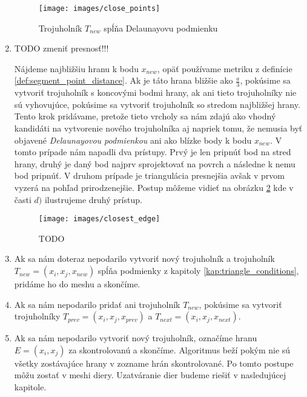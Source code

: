 \begin{enumerate}
{        \begin{figure}
            \centerline{\texttt{[image: images/close\_points]}}
            \caption[Trojuholník $T_{new}$ spĺňa Delaunayovu podmienku]{Trojuholník $T_{new}$ spĺňa Delaunayovu podmienku}
            \label{obr:close_points}
        \end{figure}
    }
    \item{
        TODO zmeniť presnosť!!!

        Nájdeme najbližšiu hranu k bodu $x_{new}$, opäť používame metriku z definície 
        \ref{def:segment_point_distance}. Ak je táto hrana bližšie ako $\frac{a}{3}$, 
        pokúsime sa vytvoriť trojuholník s koncovými bodmi hrany, ak ani tieto trojuholníky 
        nie sú vyhovujúce, pokúsime sa vytvoriť trojuholník so stredom najbližšej hrany.
        Tento krok pridávame, pretože
        tieto vrcholy sa nám zdajú ako vhodný kandidáti na vytvorenie nového trojuholníka
        aj napriek tomu, že nemusia byť objavené \textit{Delaunayovou podmienkou} ani ako 
        blízke body k bodu $x_{new}$. V tomto prípade nám napadli dva prístupy. Prvý je len pripnúť 
        bod na stred hrany, druhý je daný bod najprv sprojektovať na povrch a následne k nemu bod 
        pripnúť. V druhom prípade je triangulácia presnejšia avšak v prvom vyzerá na pohľad 
        prirodzenejšie. Postup môžeme vidieť na obrázku \ref{obr:closest_edge} kde
        v časti $d)$ ilustrujeme druhý prístup.

        \begin{figure}
            \centerline{\texttt{[image: images/closest\_edge]}}
            \caption[TODO]{TODO}
            \label{obr:closest_edge}
        \end{figure}
    }
    \item{
        Ak sa nám doteraz nepodarilo vytvoriť nový trojuholník a trojuholník $T_{new} = (x_i, x_j, x_{new})$
        spĺňa podmienky z kapitoly \ref{kap:triangle_conditions}, pridáme ho do meshu a skončíme.
    }
    \item{
        Ak sa nám nepodarilo pridať ani trojuholník $T_{new}$, pokúsime sa vytvoriť trojuholníky 
        $T_{prev} = (x_i, x_j, x_{prev})$ a $T_{next} = (x_i, x_j, x_{next})$.
    }
    \item{
        Ak sa nám nepodarilo vytvoriť nový trojuholník, označíme hranu $E = (x_i, x_j)$ za skontrolovanú
        a skončíme.
    }
    Algoritmus beží pokým nie sú všetky zostávajúce hrany v zozname hrán skontrolované. Po tomto postupe 
    môžu zostať v meshi diery. Uzatváranie dier budeme riešiť v nasledujúcej kapitole.
\end{enumerate}




















